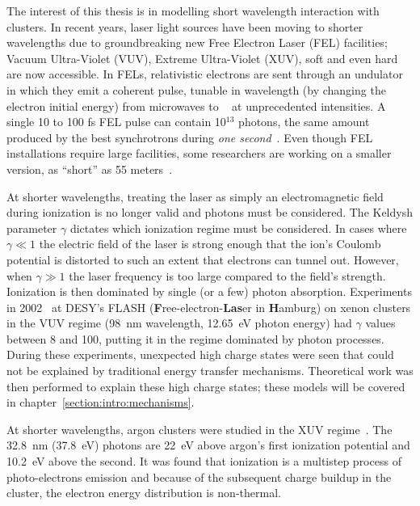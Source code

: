 The interest of this thesis is in modelling short wavelength interaction with
clusters. In recent years, laser light sources have been moving to shorter
wavelengths due to groundbreaking new Free Electron Laser (FEL)
facilities; Vacuum Ultra-Violet (VUV), Extreme Ultra-Violet (XUV), soft \xrays
and even hard \xrays are now accessible. In FELs, relativistic electrons are sent
through an undulator in which they emit a coherent pulse, tunable in wavelength
(by changing the electron initial energy)
from microwaves to \xrays~\cite{Brabec2009,Ackermann2007a,Pellegrini2012} at
unprecedented intensities. A single 10 to 100 fs FEL pulse can contain 10$^{13}$
photons, the same amount produced by the best synchrotrons during
\textit{one second}~\cite{Bostedt2009}. Even though FEL installations require
large facilities, some researchers are working on a smaller version, as
``short'' as 55 meters~\cite{Shintake2008}.

At shorter wavelengths, treating the laser as simply an electromagnetic field
during ionization is no longer valid and photons must be considered.
The Keldysh parameter $\gamma$ dictates which ionization regime must be considered. In
cases where $\gamma \ll 1$ the electric field of the laser is strong enough that
the ion's Coulomb potential is distorted to such an extent
that electrons can tunnel out.
However, when $\gamma \gg 1$ the laser frequency is too large compared to the
field's strength. Ionization is then dominated by single (or a few) photon
absorption.
Experiments in
2002~\cite{Wabnitz2002,Bostedt2009} at
DESY's FLASH (\textbf{F}ree-electron-\textbf{Las}er in \textbf{H}amburg)
on xenon clusters in the VUV regime (98~nm wavelength, 12.65~eV photon energy)
had $\gamma$ values between 8 and
100, putting it in the regime dominated by photon processes.
During these experiments, unexpected high charge states were seen that could not
be explained by traditional energy transfer mechanisms. Theoretical work was
then performed to explain these high charge states; these models will be
covered in chapter~\ref{section:intro:mechanisms}.



At shorter wavelengths,
argon clusters were studied in the XUV regime~\cite{Bostedt2008}. The 32.8~nm
(37.8~eV) photons are 22~eV above argon's first ionization
potential and 10.2~eV  above the second. It was found that ionization is a multistep process of
photo-electrons emission and because of the subsequent charge buildup in the
cluster, the electron energy distribution is non-thermal.

